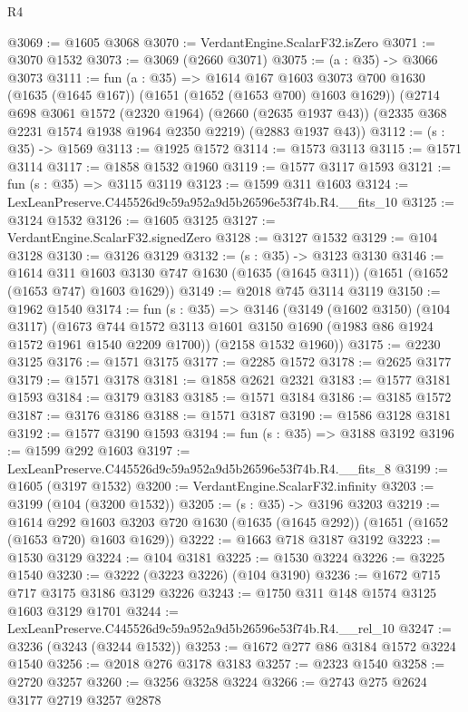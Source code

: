 \begin{lexlean}{R4}
\begin{coremodule}
@3069 := @1605 @3068
@3070 := VerdantEngine.ScalarF32.isZero
@3071 := @3070 @1532
@3073 := @3069 (@2660 @3071)
@3075 := (a : @35) -> @3066 @3073
@3111 := fun (a : @35) =>
  @1614
    @167
    @1603
    @3073
    @700
    @1630
    (@1635 (@1645 @167))
    (@1651 (@1652 (@1653 @700) @1603 @1629))
    (@2714
      @698
      @3061
      @1572
      (@2320 @1964)
      (@2660 (@2635 @1937 @43))
      (@2335 @368 @2231 @1574 @1938 @1964 @2350 @2219)
      (@2883 @1937 @43))
@3112 := (s : @35) -> @1569
@3113 := @1925 @1572
@3114 := @1573 @3113
@3115 := @1571 @3114
@3117 := @1858 @1532 @1960
@3119 := @1577 @3117 @1593
@3121 := fun (s : @35) => @3115 @3119
@3123 := @1599 @311 @1603
@3124 := LexLeanPreserve.C445526d9c59a952a9d5b26596e53f74b.R4.__fits_10
@3125 := @3124 @1532
@3126 := @1605 @3125
@3127 := VerdantEngine.ScalarF32.signedZero
@3128 := @3127 @1532
@3129 := @104 @3128
@3130 := @3126 @3129
@3132 := (s : @35) -> @3123 @3130
@3146 := @1614
    @311
    @1603
    @3130
    @747
    @1630
    (@1635 (@1645 @311))
    (@1651 (@1652 (@1653 @747) @1603 @1629))
@3149 := @2018 @745 @3114 @3119
@3150 := @1962 @1540
@3174 := fun (s : @35) =>
  @3146
    (@3149
      (@1602 @3150)
      (@104 @3117)
      (@1673 @744 @1572 @3113 @1601 @3150 @1690 (@1983 @86 @1924 @1572 @1961 @1540 @2209 @1700))
      (@2158 @1532 @1960))
@3175 := @2230 @3125
@3176 := @1571 @3175
@3177 := @2285 @1572
@3178 := @2625 @3177
@3179 := @1571 @3178
@3181 := @1858 @2621 @2321
@3183 := @1577 @3181 @1593
@3184 := @3179 @3183
@3185 := @1571 @3184
@3186 := @3185 @1572
@3187 := @3176 @3186
@3188 := @1571 @3187
@3190 := @1586 @3128 @3181
@3192 := @1577 @3190 @1593
@3194 := fun (s : @35) => @3188 @3192
@3196 := @1599 @292 @1603
@3197 := LexLeanPreserve.C445526d9c59a952a9d5b26596e53f74b.R4.__fits_8
@3199 := @1605 (@3197 @1532)
@3200 := VerdantEngine.ScalarF32.infinity
@3203 := @3199 (@104 (@3200 @1532))
@3205 := (s : @35) -> @3196 @3203
@3219 := @1614
    @292
    @1603
    @3203
    @720
    @1630
    (@1635 (@1645 @292))
    (@1651 (@1652 (@1653 @720) @1603 @1629))
@3222 := @1663 @718 @3187 @3192
@3223 := @1530 @3129
@3224 := @104 @3181
@3225 := @1530 @3224
@3226 := @3225 @1540
@3230 := @3222 (@3223 @3226) (@104 @3190)
@3236 := @1672 @715 @717 @3175 @3186 @3129 @3226
@3243 := @1750 @311 @148 @1574 @3125 @1603 @3129 @1701
@3244 := LexLeanPreserve.C445526d9c59a952a9d5b26596e53f74b.R4.__rel_10
@3247 := @3236 (@3243 (@3244 @1532))
@3253 := @1672 @277 @86 @3184 @1572 @3224 @1540
@3256 := @2018 @276 @3178 @3183
@3257 := @2323 @1540
@3258 := @2720 @3257
@3260 := @3256 @3258 @3224
@3266 := @2743 @275 @2624 @3177 @2719 @3257 @2878

\end{coremodule}
\end{lexlean}

